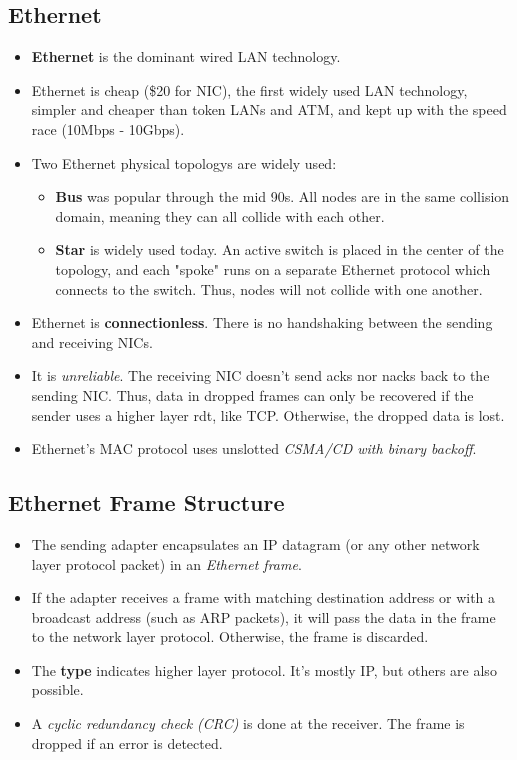 \documentclass{article}
\begin{document}
\subsection{Ethernet}

\begin{itemize}
\item {\bf Ethernet} is the dominant wired LAN technology.
\item Ethernet is cheap (\$20 for NIC), the first widely used LAN technology, simpler and cheaper than token LANs and ATM, and kept up with the speed race (10Mbps - 10Gbps).
\item Two Ethernet physical topologys are widely used:
\begin{itemize}
\item {\bf Bus} was popular through the mid 90s. All nodes are in the same collision domain, meaning they can all collide with each other.
\item {\bf Star} is widely used today. An active switch is placed in the center of the topology, and each "spoke" runs on a separate Ethernet protocol which connects to the switch. Thus, nodes will not collide with one another.
\end{itemize}
\item Ethernet is {\bf connectionless}. There is no handshaking between the sending and receiving NICs.
\item It is \emph{unreliable}. The receiving NIC doesn't send acks nor nacks back to the sending NIC. Thus, data in dropped frames can only be recovered if the sender uses a higher layer rdt, like TCP. Otherwise, the dropped data is lost.
\item Ethernet's MAC protocol uses unslotted \emph{CSMA/CD with binary backoff}.
\end{itemize}

\subsection{Ethernet Frame Structure}

\begin{itemize}
\item The sending adapter encapsulates an IP datagram (or any other network layer protocol packet) in an \emph{Ethernet frame}.
\item If the adapter receives a frame with matching destination address or with a broadcast address (such as ARP packets), it will pass the data in the frame to the network layer protocol. Otherwise, the frame is discarded.
\item The {\bf type} indicates higher layer protocol. It's mostly IP, but others are also possible.
\item A \emph{cyclic redundancy check (CRC)} is done at the receiver. The frame is dropped if an error is detected.
\end{itemize}
\end{document}
